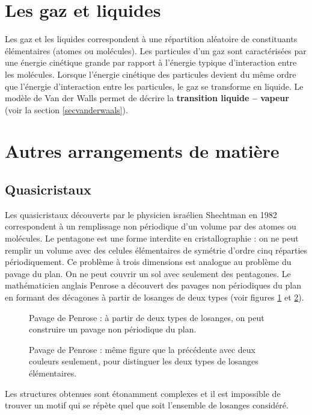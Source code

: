 \documentclass[12pt]{book}
\begin{document}
\section{Les gaz et liquides}
Les gaz et les liquides\cite{ph:physt:Diu89} correspondent \`a une r\'epartition
al\'eatoire de constituants \'el\'ementaires (atomes ou mol\'ecules).
Les particules d'un gaz sont caract\'eris\'ees par une \'energie
cin\'etique grande par rapport \`a l'\'energie typique d'interaction
entre les mol\'ecules. Lorsque l'\'energie cin\'etique des particules
devient du m\^eme ordre que l'\'energie d'interaction entre les
particules, le gaz se transforme en liquide.
Le mod\`ele de Van der Walls permet de d\'ecrire la {\bf transition liquide
-- vapeur} (voir la section \ref{secvanderwaals}).
\section{Autres arrangements de mati\`ere}
\subsection{Quasicristaux}
Les quasicristaux\cite{ph:quasi:Pignon94,ph:quasi:Jaric88}
d\'ecouverts par le physicien isra\'elien Shechtman 
en 1982 correspondent \`a un remplissage non p\'eriodique d'un volume
par des atomes ou mol\'ecules. Le pentagone est une forme interdite en
cristallographie : on ne peut remplir un volume avec des celules
\'el\'ementaires de sym\'etrie d'ordre cinq r\'eparties
p\'eriodiquement. Ce probl\`eme \`a trois dimensions est analogue au
probl\`eme du pavage du plan. On ne peut couvrir un sol avec seulement
des pentagones.
Le math\'ematicien anglais Penrose a d\'ecouvert des pavages
non p\'eriodiques 
du plan en formant des d\'ecagones \`a partir de losanges de deux
types (voir figures \ref{figpenrose} et \ref{figpenrose2}). 
\begin{figure}[htb]
 \centerline{}   
 \caption{Pavage de Penrose : \`a partir de deux types de losanges, on
peut construire un pavage non p\'eriodique du plan.}
 \label{figpenrose}
\end{figure}
\begin{figure}[htb]
 \centerline{}   
 \caption{Pavage de Penrose : m\^eme figure que la pr\'ec\'edente avec
deux couleurs seulement, pour distinguer les deux types de losanges
\'el\'ementaires. }
 \label{figpenrose2}
\end{figure}
Les
structures obtenues sont \'etonamment complexes et il est impossible
de trouver un motif qui se r\'ep\`ete quel que soit l'ensemble de
losanges consid\'er\'e.  
\end{document}
